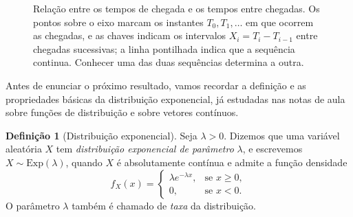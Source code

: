 \documentclass[12pt,portuguese]{article}
\theoremstyle{definition}
\newtheorem{definition}[definition]{Definição}
\theoremstyle{plainexercise}
\theoremstyle{starredexercise}
\theoremstyle{definition}
\begin{document}
\begin{figure}[H]
  \centering
  \caption{Relação entre os tempos de chegada e os tempos entre chegadas. Os
    pontos sobre o eixo marcam os instantes $T_0,T_1,\ldots$ em que ocorrem as
    chegadas, e as chaves indicam os intervalos $X_i=T_i-T_{i-1}$ entre
    chegadas sucessivas; a linha pontilhada indica que a sequência continua.
    Conhecer uma das duas sequências determina a outra.}
  \label{fig:tempos-entre-chegadas}
\end{figure}

Antes de enunciar o próximo resultado, vamos recordar a definição e as
propriedades básicas da distribuição exponencial, já estudadas nas notas de
aula sobre funções de distribuição e sobre vetores contínuos.

\begin{definition}[Distribuição exponencial]\label{def:distribuicao-exponencial}
Seja $\lambda>0$. Dizemos que uma variável aleatória $X$ tem
\emph{distribuição exponencial de parâmetro} $\lambda$, e escrevemos
$X\sim\mathrm{Exp}(\lambda)$, quando $X$ é absolutamente contínua e admite a
função densidade
\[
  f_X(x)=
  \begin{cases}
    \lambda e^{-\lambda x}, & \text{se } x\geqslant 0,
    \\[0.2cm]
    0, & \text{se } x<0.
  \end{cases}
\]
O parâmetro $\lambda$ também é chamado de \emph{taxa} da distribuição.
\end{definition}
\end{document}
